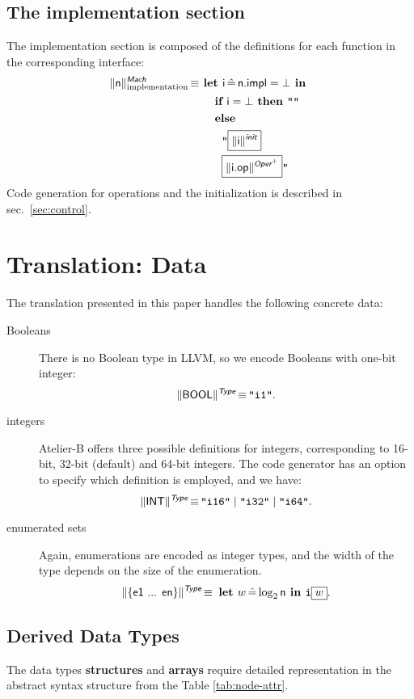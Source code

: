 \documentclass{llncs}
\newcommand{\trad}[2]{\ensuremath{\lVert \textsf{#1} \rVert^{\textit{#2}}}}
\DeclareMathOperator{\isdef}{\equiv}
\newcommand{\llvm}[1]{\texttt{#1}}
\newcommand{\B}[1]{\textsf{#1}}
\newcommand{\ListOf}[1]{$\mbox{#1}^+$}
\newcommand{\IF}[0]{\textbf{ if }}
\newcommand{\ELSE}[0]{\textbf{ else }}
\newcommand{\THEN}[0]{\textbf{ then }}
\newcommand{\LET}[0]{\textbf{ let }}
\DeclareMathOperator{\BE}{\hat{=}}
\newcommand{\IN}[0]{\textbf{ in }}
\newcommand{\PH}[1]{\framebox{$#1$}}
\begin{document}
\subsection{The implementation section}

The implementation section is composed of the definitions for each function
in the corresponding interface:
\begin{align*}
  \trad{\B{n}}{\B{Mach}}_{\text{implementation}} \isdef
  & \LET \B{i} \BE \B{n.impl} = \bot \IN\\
  & \quad \IF \B{i} = \bot \THEN \llvm{""} \\
  & \quad \ELSE \\
  & \quad \quad \llvm{"\PH{\trad{\B{i}}{\B{init}}}} \\
  & \quad \quad \llvm{\PH{\trad{\B{i.op}}{\ListOf{\B{Oper}}}}"}
\end{align*}
Code generation for operations and the initialization is described in
sec.~\ref{sec:control}.

\section{Translation: Data}
\label{sec:data}

The translation presented in this paper handles the following concrete data:
\begin{description}
\item[Booleans] There is no Boolean type in LLVM, so we encode Booleans with
  one-bit integer:
$$\trad{BOOL}{\B{Type}} \isdef \llvm{"i1"}.$$
\item[integers] Atelier-B offers three possible definitions for integers,
  corresponding to 16-bit, 32-bit (default) and 64-bit integers. The code
  generator has an option to specify which definition is employed, and we have:
$$\trad{INT}{\B{Type}} \isdef \llvm{"i16"} \mid \llvm{"i32"} \mid \llvm{"i64"}.$$
\item[enumerated sets] Again, enumerations are encoded as integer types, and the
  width of the type depends on the size of the enumeration.
$$\trad{\{e1 ... en\}}{\B{Type}} \isdef \LET w \BE \log_2 \B{n} \IN \llvm{i\PH{w}}.$$

\end{description}

\subsection{Derived Data Types}

The data types \textbf{structures} and \textbf{arrays} require detailed 
representation in the abstract syntax structure from the Table \ref{tab:node-attr}.
\end{document}
